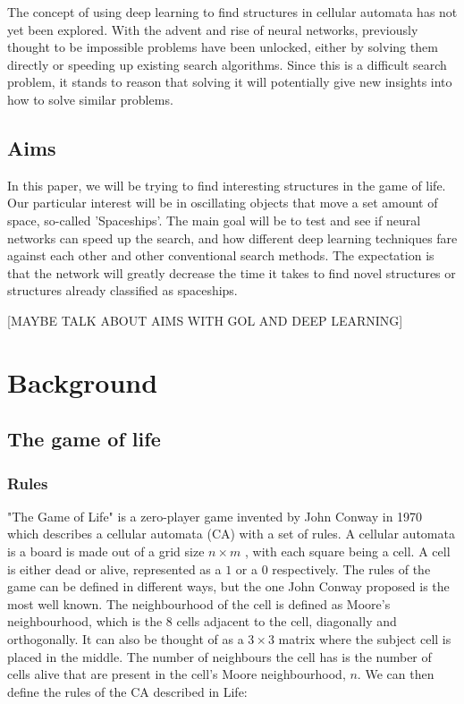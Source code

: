 \documentclass{l4proj}
\begin{document}
The concept of using deep learning to find structures in cellular automata has not yet been explored. With the advent and rise of neural networks, previously thought to be impossible problems have been unlocked, either by solving them directly or speeding up existing search algorithms. Since this is a difficult search problem, it stands to reason that solving it will potentially give new insights into how to solve similar problems.

\section{Aims}

In this paper, we will be trying to find interesting structures in the game of life. Our particular interest will be in oscillating objects that move a set amount of space, so-called 'Spaceships'. The main goal will be to test and see if neural networks can speed up the search, and how different deep learning techniques fare against each other and other conventional search methods. The expectation is that the network will greatly decrease the time it takes to find novel structures or structures already classified as spaceships.

[MAYBE TALK ABOUT AIMS WITH GOL AND DEEP LEARNING]


\chapter{Background}

\section{The game of life}

\subsection{Rules}

"The Game of Life" is a zero-player game invented by John Conway in 1970 which describes a cellular automata (CA) with a set of rules. A cellular automata is a board is made out of a grid size $n\times m$ , with each square being a cell. A cell is either dead or alive, represented as a $1$ or a $0$ respectively. The rules of the game can be defined in different ways, but the one John Conway proposed is the most well known. The neighbourhood of the cell is defined as Moore's neighbourhood, which is the 8 cells adjacent to the cell, diagonally and orthogonally. It can also be thought of as a $3\times 3$ matrix where the subject cell is placed in the middle. The number of neighbours the cell has is the number of cells alive that are present in the cell's Moore neighbourhood, $n$. We can then define the rules of the CA described in Life:
\end{document}
